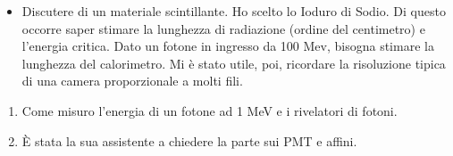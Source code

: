 \documentclass[../main.tex]{subfiles}
\begin{document}
    \begin{itemize}
        \item Discutere di un materiale scintillante. Ho scelto lo Ioduro di Sodio. Di questo occorre saper stimare la lunghezza di radiazione (ordine del centimetro) e l'energia critica. Dato un fotone in ingresso da 100 Mev, bisogna stimare la lunghezza del calorimetro. Mi è stato utile, poi, ricordare la risoluzione tipica di una camera proporzionale a molti fili.
    \end{itemize}
    \begin{enumerate}
        \item Come misuro l’energia di un fotone ad 1 MeV e i rivelatori di fotoni.
        \item È stata la sua assistente a chiedere la parte sui PMT e affini.
    \end{enumerate}
\end{document}
